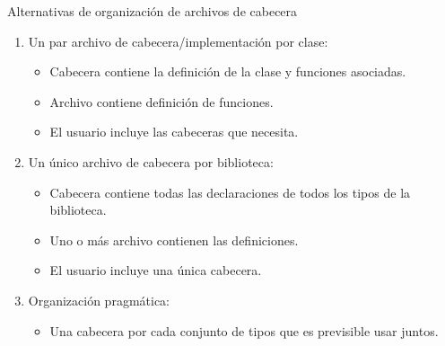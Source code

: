 \begin{frame}[t]{Alternativas de organización de archivos de cabecera}
\begin{enumerate}[a]
  \item Un par archivo de cabecera/implementación por clase:
    \begin{itemize}
      \item Cabecera contiene la definición de la clase y funciones asociadas.
      \item Archivo  contiene definición de funciones.
      \item El usuario incluye las cabeceras que necesita.
    \end{itemize}

  \item Un único archivo de cabecera por biblioteca:
    \begin{itemize}
      \item Cabecera contiene todas las declaraciones de todos los tipos de la biblioteca.
      \item Uno o más archivo  contienen las definiciones.
      \item El usuario incluye una única cabecera.
    \end{itemize}

  \item Organización pragmática:
    \begin{itemize}
      \item Una cabecera por cada conjunto de tipos que es previsible usar juntos.
    \end{itemize}
\end{enumerate}
\end{frame}
